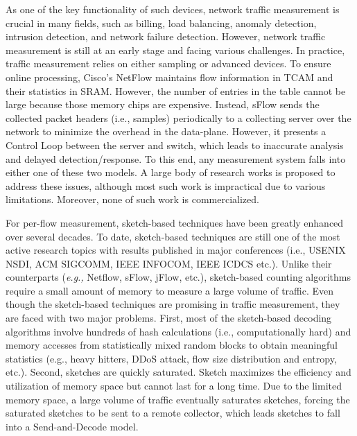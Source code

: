 \documentclass{NSF}
\newcommand{\etc}{{etc.}\xspace}
\newcommand{\eg}{{\em e.g.,}\xspace}
\begin{document}
As one of the key functionality of such devices, network traffic measurement is crucial in many fields, such as billing, load balancing, anomaly detection, intrusion detection, and network failure detection. However, network traffic measurement is still at an early stage and facing various challenges. 
In practice, traffic measurement relies on either sampling or advanced devices. To ensure online processing, Cisco's NetFlow maintains flow information in TCAM and their statistics in SRAM. However, the number of entries in the table cannot be large because those memory chips are expensive. Instead, sFlow sends the collected packet headers (i.e., samples) periodically to a collecting server over the network to minimize the overhead in the data-plane. However, it presents a Control Loop 
between the server and switch, which leads to inaccurate analysis and delayed detection/response. To this end, any measurement system falls into either one of these two models. 
A large body of research works is proposed to address these issues, although most such work is impractical due to various limitations. Moreover, none of such work is commercialized.

For per-flow measurement, sketch-based techniques have been greatly enhanced over several decades. To date, sketch-based techniques are still one of the most active research topics with results published in major conferences (i.e., USENIX NSDI, ACM SIGCOMM, IEEE INFOCOM, IEEE ICDCS \etc). Unlike their counterparts (\eg Netflow, sFlow, jFlow, \etc), sketch-based counting algorithms require a small amount of memory to measure a large volume of traffic.%
Even though the sketch-based techniques are promising in traffic measurement, they are faced with two major problems. First, most of the sketch-based decoding algorithms involve hundreds of hash calculations (i.e., computationally hard) and memory accesses from statistically mixed random blocks to obtain meaningful statistics (e.g., heavy hitters, DDoS attack, flow size distribution and entropy, etc.). Second, sketches are quickly saturated. Sketch maximizes the efficiency and utilization of memory space but cannot last for a long time. Due to the limited memory space, a large volume of traffic eventually saturates sketches, forcing the saturated sketches to be sent to a remote collector, which leads sketches to fall into a Send-and-Decode model.
\end{document}
